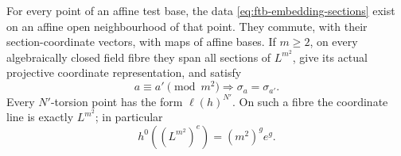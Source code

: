 \begin{lemma}
\label{lem:ftb-actual-periodic-embedding}
For every point of an affine test base, the data
\eqref{eq:ftb-embedding-sections} exist on an affine open
neighbourhood of that point.
They commute, with their section-coordinate vectors,
with maps of affine bases.
If \(m\ge2\), on every algebraically closed field fibre
they span all sections of \(L^{m^2}\), give its actual
projective coordinate representation, and satisfy
\[
             a\equiv a'\pmod {m^2}
                         \Longrightarrow \sigma_a=\sigma_{a'}.
 \tag{TE4}\label{eq:ftb-theta-section-periodicity}
\]
Every \(N'\)-torsion point has the form \(\ell(h)^{N'}\).
On such a fibre the coordinate line is exactly \(L^{m^2}\);
in particular
\[
                           h^0((L^{m^2})^e)=(m^2)^g e^g.
 \tag{TE5}\label{eq:ftb-theta-exact-h0}
\]
\end{lemma}
